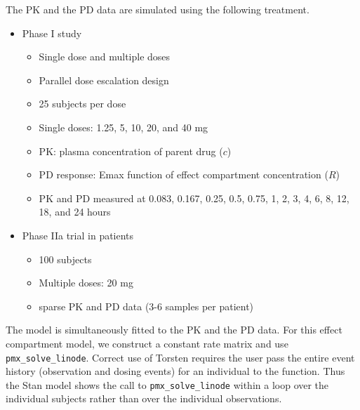 \documentclass[11pt, reqno, oneside]{amsbook}
\numberwithin{equation}{chapter}
\numberwithin{figure}{chapter}
\numberwithin{table}{chapter}
\theoremstyle{remark}
\begin{document}
The PK and the PD data are simulated using the following
treatment.
\begin{itemize}
\item Phase I study
\begin{itemize}
\item Single dose and multiple doses
\item Parallel dose escalation design
\item 25 subjects per dose
\item Single doses: 1.25, 5, 10, 20, and 40 mg
\item PK: plasma concentration of parent drug (\(c\))
\item PD response: Emax function of effect compartment concentration (\(R\))
\item PK and PD measured at 0.083, 0.167, 0.25, 0.5, 0.75, 1, 2, 3, 4, 6, 8, 12, 18, and 24 hours
\end{itemize}
\item Phase IIa trial in patients
\begin{itemize}
\item 100 subjects
\item Multiple doses: 20 mg
\item sparse PK and PD data (3-6 samples per patient)
\end{itemize}
\end{itemize}

The model is simultaneously fitted to the PK and the PD
data. For this effect compartment model, we construct a
constant rate matrix and use \texttt{pmx\_solve\_linode}. Correct use of
Torsten requires the user pass the entire event history
(observation and dosing events) for an individual to the
function. Thus the Stan model shows the call to \texttt{pmx\_solve\_linode}
within a loop over the individual subjects rather than over
the individual observations.
\end{document}
